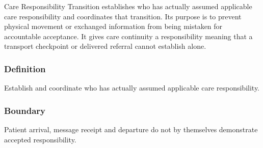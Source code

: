 Care Responsibility Transition establishes who has actually assumed applicable care responsibility and coordinates that transition. Its purpose is to prevent physical movement or exchanged information from being mistaken for accountable acceptance. It gives care continuity a responsibility meaning that a transport checkpoint or delivered referral cannot establish alone.

\subsubsection*{Definition}

Establish and coordinate who has actually assumed applicable care responsibility.

\subsubsection*{Boundary}

Patient arrival, message receipt and departure do not by themselves demonstrate accepted responsibility.

